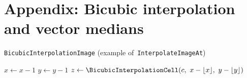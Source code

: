 \documentclass{ipol}
\begin{document}
%

\section*{Appendix: Bicubic interpolation and vector medians}

\begin{algorithm}[H]
	\caption{\texttt{BicubicInterpolationImage} (example
	of~\texttt{InterpolateImageAt})}
	\label{alg:bicubicinterpolationimage}
	\dontprintsemicolon

	\BlankLine
	$x\leftarrow x-1$\;
	$y\leftarrow y-1$\;
	$z\leftarrow\BicubicInterpolationCell(c,\ x-\lfloor x\rfloor,\ y-\lfloor
	y\rfloor)$\;
\end{algorithm}
\end{document}

